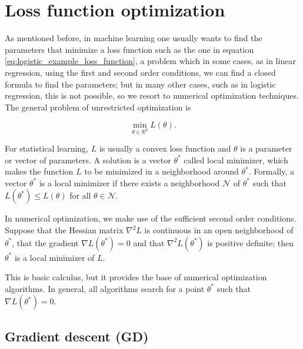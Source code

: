 
\section{Loss function optimization}

As mentioned before, in machine learning one usually wants to find the parameters that minimize a loss function such as the one in equation \ref{eq:logistic_example_loss_function}, a problem which in some cases, as in linear regression, using the first and second order conditions, we can find a closed formula to find the parameters; but in many other cases, such as in logistic regression, this is not possible, so we resort to numerical optimization techniques.
The general problem of unrestricted optimization \cite{nocedal2006numerical} is

\begin{equation*}
  \min_{\theta \in \mathbb{R}^p} L(\theta).
\end{equation*}


For statistical learning, $L$ is usually a convex loss function and $\theta$ is a parameter or vector of parameters. A solution is a vector $\theta^*$ called local minimizer, which makes the function $L$ to be minimized in a neighborhood around $\theta^*$. Formally, a vector $\theta^*$ is a local minimizer if there exists a neighborhood $\mathcal{N}$ of $\theta^*$ such that $L(\theta^*) \leq L(\theta)$ for all $\theta \in \mathcal{N}$.

In numerical optimization, we make use of the sufficient second order conditions. Suppose that the Hessian matrix $\nabla^2 L$ is continuous in an open neighborhood of $\theta^*$, that the gradient $\nabla L(\theta^*) = 0$ and that $\nabla^2 L(\theta^*)$ is positive definite; then $\theta^*$ is a local minimizer of $L$.

This is basic calculus, but it provides the base of numerical optimization algorithms. In general, all algorithms search for a point $\theta^*$ such that $\nabla L(\theta^*) = 0$.



\subsection{Gradient descent (GD)}


